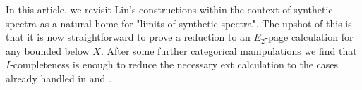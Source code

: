 In this article, we revisit Lin's constructions within the context of synthetic spectra
as a natural home for "limits of synthetic spectra". The upshot of this is that it is now straightforward to prove a reduction to an $E_2$-page calculation for any bounded below $X$. 
After some further categorical manipulations we find that $I$-completeness is enough to reduce the necessary ext calculation to the cases already handled in \cite{lin1980calculation} and \cite{gunawardena1980segal}.

\begin{comment}

The conjecture was answered to be true by a sequence of progress, for $G = \bb{Z}/2$ by W. H. Lin \cite{lin1980conjectures}, for $G = C_p$  for odd primes by J. H. Gunawardena \cite{gunawardena1980segal}, for elementary abelian groups by J. F. Adams, J. H. 
Gunawardena, H. Miller \cite{adams1974stable} and G. Carlsson \cite{carlsson1983gb} and finally for all groups by G.Carlsson \cite{carlsson1984equivariant}.

There is a spectrum-level statement of the above statement. Let $G$ be a finite $p$-group. $\rm{Sp}_{G}$ be the category of genuine equivariant spectra, with unit object $\bb{S}_{G}$ the $G$-equivariant sphere. Then the Segal conjecture can be stated as the comparison map:
$$(\bb{S}_{G})^{G} \rightarrow (\bb{S}_{G})^{hG}$$
is an isomorphism after $p$-completion.

Let $G  = C_p$, for any $X \in \rm{Sp}_{G}$ we have the Tate pullback square:
\[\begin{tikzcd}
	{X^{C_p}} & {\Phi^{C_p}(X)} \\
	{X^{hC_p}} & {X^{tC_p}}
	\arrow[from=1-1, to=1-2]
	\arrow[from=1-1, to=2-1]
	\arrow[from=1-2, to=2-2]
	\arrow[from=2-1, to=2-2]
	\arrow["\lrcorner"{anchor=center, pos=0.125}, draw=none, from=1-1, to=2-2]
\end{tikzcd}\]
This implies to get the isomorphism 
$$(\bb{S}_{G})^{G} \rightarrow (\bb{S}_{G})^{hG}$$ 
if and only if 
$$\Phi^{C_p}(\bb{S}_G)  \cong \bb{S} \rightarrow \bb{S}^{tC_p}$$
is an isomorphism after p-completion.

\begin{thm} \cite{lin1980conjectures, gunawardena1980segal} \label{linmainthm}
    The natural map $\bb{S}^{\wedge}_{p} \to \bb{S}^{tC_p}$ is an isomorphism.
    \qed
\end{thm}

We have the inflation functor $i: \rm{Sp} \rightarrow \rm{Sp}_{G}$, which is a symmetric monoidal functor and a left adjoint. Using this, any spectrum $X$ can be seen as genuine $G$-spectrum whose underlying Borel spectrum $X$ with a trivial action of $G$.


\end{comment}
